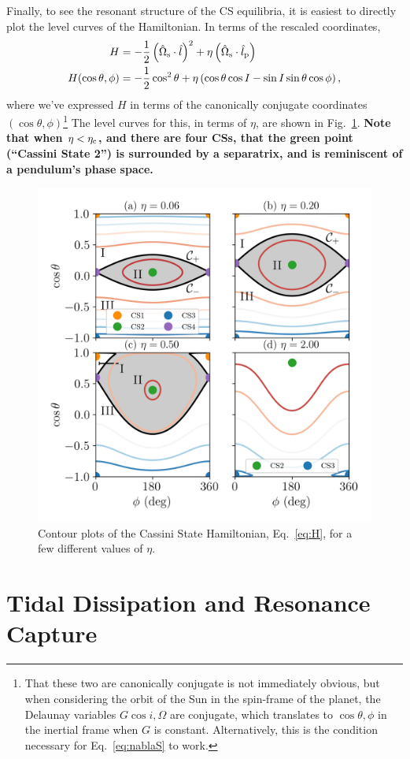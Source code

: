 \documentclass[11pt,
        usenames, %
        dvipsnames %
    ]{article}
\newcommand*{\p}[1]{\left(#1\right)}
\begin{document}
Finally, to see the resonant structure of the CS equilibria, it is easiest to
directly plot the level curves of the Hamiltonian. In terms of the rescaled
coordinates,
\begin{align}
    H &= -\frac{1}{2}\p{\hat{\Omega}_{\rm s} \cdot \hat{l}}^2
            + \eta\p{\hat{\Omega}_{\rm s} \cdot \hat{l}_{\rm p}}\nonumber\\
    H(\cos\theta, \phi) &= -\frac{1}{2} \cos^2\theta
            + \eta\p{\cos\theta \cos I - \sin I \sin\theta \cos \phi},\label{eq:H}
\end{align}
where we've expressed $H$ in terms of the canonically conjugate coordinates
$(\cos\theta, \phi)$\footnote{That these two are canonically conjugate is not
immediately obvious, but when considering the orbit of the Sun in the spin-frame
of the planet, the Delaunay variables $G\cos i, \Omega$ are conjugate, which
translates to $\cos\theta, \phi$ in the inertial frame when $G$ is constant.
Alternatively, this is the condition necessary for Eq.~\eqref{eq:nablaS} to
work.}
The level curves for this, in terms of $\eta$, are shown in
Fig.~\ref{fig:contours}. \textbf{Note that when $\eta < \eta_{\rm c}$, and there
are four CSs, that the green point (``Cassini State 2'') is surrounded by a
separatrix, and is reminiscent of a pendulum's phase space.}
\begin{figure}
    \centering
    \includegraphics[width=0.6\columnwidth]{1contours20.png}
    \caption{Contour plots of the Cassini State Hamiltonian,
    Eq.~\eqref{eq:H}, for a few different values of $\eta$.}\label{fig:contours}
\end{figure}

\section{Tidal Dissipation and Resonance Capture}
\end{document}
